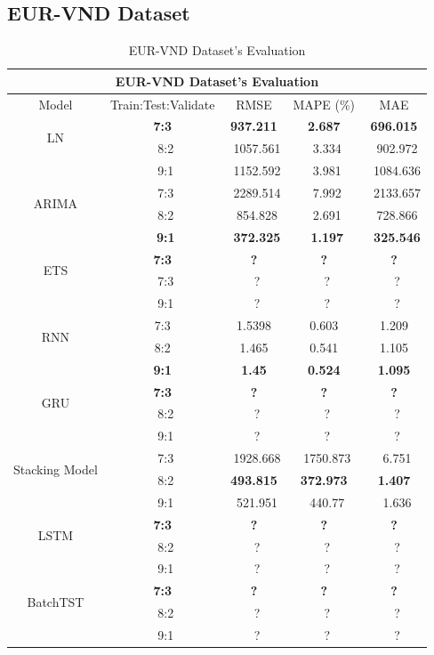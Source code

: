 \documentclass{ieeeojies}
\begin{document}
\subsection{EUR-VND Dataset} 
\begin{table}[H]
    \centering
    \begin{tabular}{|c|c|c|c|c|}
         \hline
         \multicolumn{5}{|c|}{\textbf{EUR-VND Dataset's Evaluation}}\\
         \hline
         \centering Model & Train:Test:Validate & RMSE & MAPE (\%) & MAE\\
         \hline
         \multirow{2}{*}{LN} &\textbf{7:3} &\textbf{937.211} &\textbf{2.687} &\textbf{696.015} \\ &\ 8:2 &\ 1057.561 &\ 3.334 &\ 902.972 \\&\ 9:1 &\ 1152.592 &\ 3.981 &\ 1084.636 \\
         \hline
         \multirow{2}{*}{ARIMA} &\ 7:3 &\ 2289.514 &\ 7.992 &\ 2133.657 \\ &\ 8:2 &\ 854.828 &\ 2.691 &\ 728.866 \\&\ \textbf{9:1} &\ \textbf{372.325} &\ \textbf{1.197} &\ \textbf{325.546} \\
         \hline
         \multirow{2}{*}{ETS} &\textbf{7:3} &\textbf{?}&\textbf{?}&\textbf{?} \\ &\ 7:3 &\ ?&\ ? &\ ? \\&\ 9:1 &\ ? &\ ? &\ ? \\
         \hline
         \multirow{2}{*}{RNN} & 7:3 & 1.5398 & 0.603 & 1.209 \\ & 8:2 & 1.465 & 0.541 & 1.105 \\& \textbf{9:1} & \textbf{1.45} & \textbf{0.524} & \textbf{1.095} \\
         \hline
         \multirow{2}{*}{GRU} &\textbf{7:3} &\textbf{?}&\textbf{?}&\textbf{?} \\ &\ 8:2 &\ ?&\ ? &\ ? \\&\ 9:1 &\ ? &\ ? &\ ? \\
         \hline
         \multirow{2}{*}{Stacking Model} &\ 7:3 &\ 1928.668 &\ 1750.873 &\ 6.751 \\ &\ 8:2 &\textbf{493.815} &\textbf{372.973} &\textbf{1.407}\\&\ 9:1 &\ 521.951 &\ 440.77 &\ 1.636 \\
         \hline
         \multirow{2}{*}{LSTM} &\textbf{7:3} &\textbf{?}&\textbf{?}&\textbf{?} \\ &\ 8:2 &\ ?&\ ? &\ ? \\&\ 9:1 &\ ? &\ ? &\ ? \\
         \hline
         \multirow{2}{*}{BatchTST} &\textbf{7:3} &\textbf{?}&\textbf{?}&\textbf{?} \\ &\ 8:2 &\ ?&\ ? &\ ? \\&\ 9:1 &\ ? &\ ? &\ ? \\
         \hline
    \end{tabular}
    \caption{EUR-VND Dataset's Evaluation}
    \label{vcbresult}
\end{table}
\end{document}
